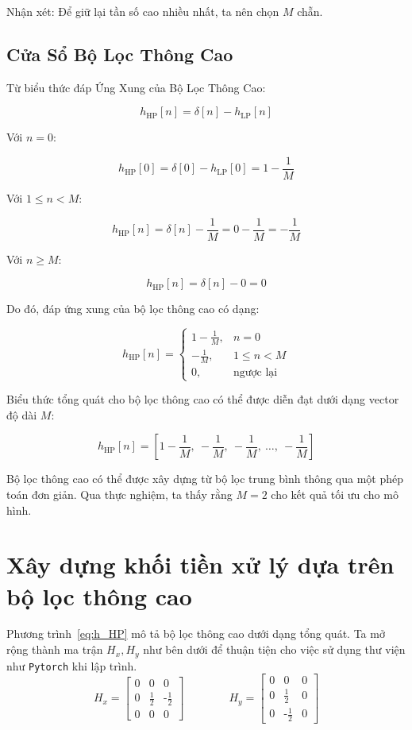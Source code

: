 Nhận xét: Để giữ lại tần số cao nhiều nhất, ta nên chọn \( M \) chẵn.

\subsection*{Cửa Sổ Bộ Lọc Thông Cao}
\label{sec:cua_so_loc_thong_cao}

Từ biểu thức đáp Ứng Xung của Bộ Lọc Thông Cao:

\[
h_{\mathrm{HP}}[n] = \delta[n] - h_{\mathrm{LP}}[n]
\]

Với \( n = 0 \):

\[
h_{\mathrm{HP}}[0] = \delta[0] - h_{\mathrm{LP}}[0] = 1 - \frac{1}{M}
\]

Với \( 1 \leq n < M \):

\[
h_{\mathrm{HP}}[n] = \delta[n] - \frac{1}{M} = 0 - \frac{1}{M} = -\frac{1}{M}
\]

Với \( n \geq M \):

\[
h_{\mathrm{HP}}[n] = \delta[n] - 0 = 0
\]

Do đó, đáp ứng xung của bộ lọc thông cao có dạng:

\[
h_{\mathrm{HP}}[n] =
\begin{cases}
	1 - \frac{1}{M}, & n = 0 \\
	-\frac{1}{M}, & 1 \leq n < M \\
	0, & \text{ngược lại}
\end{cases}
\]

Biểu thức tổng quát cho bộ lọc thông cao có thể được diễn đạt dưới dạng vector độ dài \( M \):

\begin{equation}
	\label{eq:h_HP}
	h_{\mathrm{HP}}[n] = \left[ 1 - \frac{1}{M},\ -\frac{1}{M},\ -\frac{1}{M},\ \ldots,\ -\frac{1}{M} \right]
\end{equation}
%

Bộ lọc thông cao có thể được xây dựng từ bộ lọc trung bình thông qua một phép toán đơn giản. Qua thực nghiệm, ta thấy rằng \( M = 2 \) cho kết quả tối ưu cho mô hình.
%
%
\section{Xây dựng khối tiền xử lý dựa trên bộ lọc thông cao}
Phương trình~\eqref{eq:h_HP} mô tả bộ lọc thông cao dưới dạng tổng quát. Ta mở rộng thành ma trận $H_x, H_y$ như bên dưới để thuận tiện cho việc sử dụng thư viện như \texttt{Pytorch} khi lập trình.
	\[
	H_x = \begin{bmatrix}
		0 & 0 & 0 \\
		0 & \tfrac{1}{2} &  \text{-}\tfrac{1}{2} \\
		0 & 0 & 0
	\end{bmatrix} \qquad \qquad
	H_y = \begin{bmatrix}
		0 & 0 & 0 \\
		0 & \tfrac{1}{2} &  0 \\
		0 & \text{-}\tfrac{1}{2} & 0
	\end{bmatrix}
	\]
	
